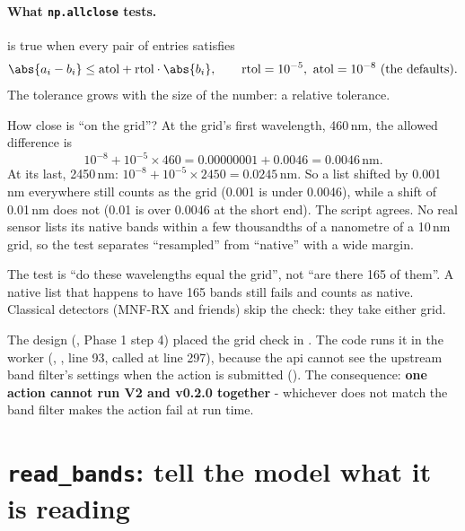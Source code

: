 \paragraph{What \texttt{np.allclose} tests.} 
 is true when every pair of entries satisfies
\begin{equation}
\abs{a_i - b_i} \le \mathrm{atol} + \mathrm{rtol} \cdot \abs{b_i}, \qquad \mathrm{rtol} = 10^{-5},\ \mathrm{atol} =
10^{-8} \ \text{(the defaults)}. \label{eq:shipping:allclose}
\end{equation}
The tolerance grows with the size of the number: a relative tolerance.

\begin{worked}[label={we:shipping:allclose}]{How close is ``on the grid''?}
At the grid's first wavelength, 460\,nm, the allowed difference is
\[
10^{-8} + 10^{-5} \times 460 = 0.00000001 + 0.0046 = 0.0046\,\text{nm}.
\]
At its last, 2450\,nm: $10^{-8} + 10^{-5} \times 2450 = 0.0245$\,nm. So a list shifted by 0.001\,nm everywhere still
counts as the grid (0.001 is under 0.0046), while a shift of 0.01\,nm does not (0.01 is over 0.0046 at the short end).
The script agrees\tagC. No real sensor lists its native bands within a few thousandths of a nanometre of a 10\,nm grid,
so the test separates ``resampled'' from ``native'' with a wide margin.
\end{worked}

The test is ``do these wavelengths equal the grid'', not ``are there 165 of them''. A native list that happens to have
165 bands still fails  and counts as native. Classical detectors (MNF-RX and friends) skip the check:
they take either grid.

\begin{sourcenote}
The design (, Phase 1 step 4) placed the grid check in
. The code runs it in the worker (,
, line 93, called at line 297), because the api cannot see
the upstream band filter's settings when the action is submitted (). The consequence:
\textbf{one action cannot run V2 and v0.2.0 together} - whichever does not match the band filter makes the action fail at
run time.
\end{sourcenote}

\section{\texttt{read\_bands}: tell the model what it is reading}\label{sec:shipping:readbands}

